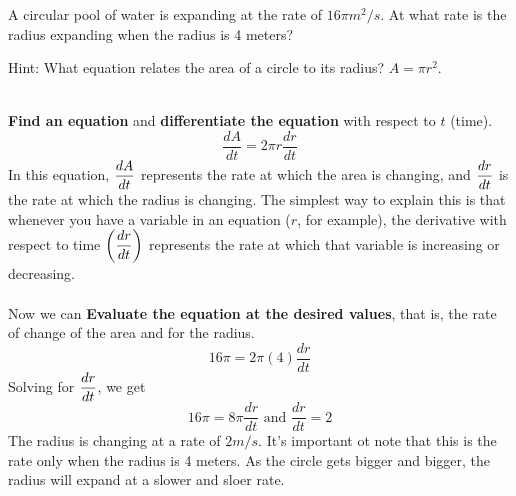 \begin{example}
    A circular pool of water is expanding at the rate of $16\pi m^2/s$. At what rate is the radius expanding when the radius is 4 meters?

    Hint: What equation relates the area of a circle to its radius? $A=\pi r^2$.  \cite{ap}\\
    \begin{solution}~\\
        \textbf{Find an equation} and \textbf{differentiate the equation} with respect to $t$ (time).
        $$\dfrac{dA}{dt}=2\pi r\dfrac{dr}{dt}$$
        In this equation, $\displaystyle\dfrac{dA}{dt}$ represents the rate at which the area is changing, and $\displaystyle\dfrac{dr}{dt}$ is the rate at which the radius is changing. The simplest way to explain this is that whenever you have a variable in an equation ($r$, for example), the derivative with respect to time $\displaystyle\left(\dfrac{dr}{dt}\right)$ represents the rate at which that variable is increasing or decreasing.
        \\\\
        Now we can \textbf{Evaluate the equation at the desired values}, that is, the rate of change of the area and for the radius.
        $$16\pi =2\pi (4)\dfrac{dr}{dt}$$
        Solving for $\displaystyle\dfrac{dr}{dt}$, we get
        $$16\pi =8\pi \dfrac{dr}{dt}\text{ and }\dfrac{dr}{dt}=2$$
        The radius is changing at a rate of $2m/s$. It's important ot note that this is the rate only when the radius is 4 meters. As the circle gets bigger and bigger, the radius will expand at a slower and sloer rate.
    \end{solution}
\end{example}

